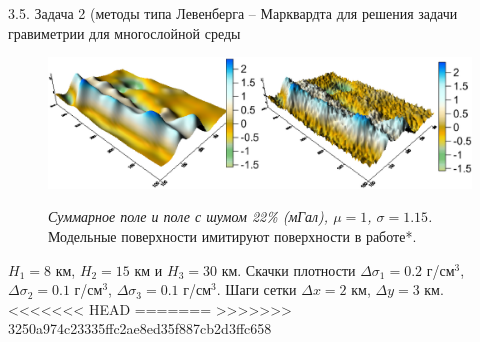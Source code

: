 \documentclass[10pt,pdf, mathserif, hyperref={unicode}]{beamer}
\begin{document}
\begin{frame}{\small 3.5. Задача 2 (методы типа Левенберга -- Марквардта для решения задачи гравиметрии для многослойной среды}
	\begin{figure}
		\centering
		\includegraphics[height=0.3\textheight]{fields}
		
		\centering\textit{Суммарное поле и поле с шумом 22\% (мГал), $\mu=1$, $\sigma=1.15$.}
\flushleft
Модельные поверхности имитируют поверхности в работе*.
%		
	\end{figure}
%	
	$H_1=8$ км, $H_2=15$ км и $H_3=30$ км. Скачки плотности $\Delta\sigma_1=0.2$ г/см$^3$, $\Delta\sigma_2=0.1$ г/см$^3$, $\Delta\sigma_3=0.1$ г/см$^3$. Шаги сетки $\Delta x=2$ км, $\Delta y=3$ км.
<<<<<<< HEAD
	\let\thefootnote\relax\let\thefootnote\relax{}
=======
	\let\thefootnote\relax\let\thefootnote\relax{}
>>>>>>> 3250a974c23335ffc2ae8ed35f887cb2d3ffc658
\end{frame}
\end{document}
